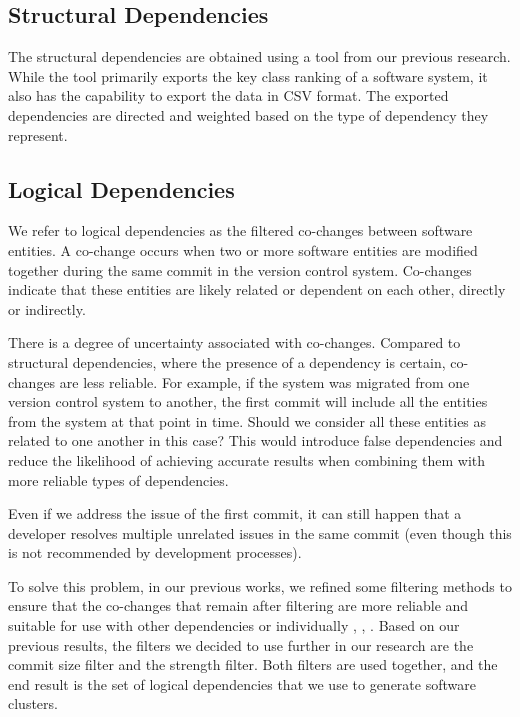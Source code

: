 \documentclass{ieeeaccess}
\begin{document}
\subsection{Structural Dependencies}
\label{subsec:sd}

The structural dependencies are obtained using a tool from our previous research. While the tool primarily exports the key class ranking of a software system, it also has the capability to export the data in CSV format. The exported dependencies are directed and weighted based on the type of dependency they represent.

\subsection{Logical Dependencies}
\label{subsec:ld}

We refer to logical dependencies as the filtered co-changes between software entities. A co-change occurs when two or more software entities are modified together during the same commit in the version control system. Co-changes indicate that these entities are likely related or dependent on each other, directly or indirectly.

There is a degree of uncertainty associated with co-changes. Compared to structural dependencies, where the presence of a dependency is certain, co-changes are less reliable. For example, if the system was migrated from one version control system to another, the first commit will include all the entities from the system at that point in time. Should we consider all these entities as related to one another in this case? This would introduce false dependencies and reduce the likelihood of achieving accurate results when combining them with more reliable types of dependencies.

Even if we address the issue of the first commit, it can still happen that a developer resolves multiple unrelated issues in the same commit (even though this is not recommended by development processes).

To solve this problem, in our previous works, we refined some filtering methods to ensure that the co-changes that remain after filtering are more reliable and suitable for use with other dependencies or individually \cite{b4}, \cite{b5}, \cite{b6}. Based on our previous results, the filters we decided to use further in our research are the commit size filter and the strength filter. Both filters are used together, and the end result is the set of logical dependencies that we use to generate software clusters.
\end{document}
